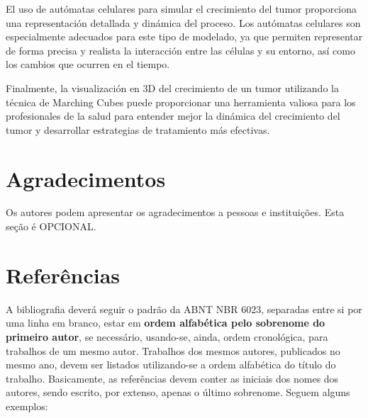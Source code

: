\documentclass[a4paper,11pt]{article}
\begin{document}
{El uso de autómatas celulares para simular el crecimiento del tumor proporciona una representación detallada y dinámica del proceso. Los autómatas celulares son especialmente adecuados para este tipo de modelado, ya que permiten representar de forma precisa y realista la interacción entre las células y su entorno, así como los cambios que ocurren en el tiempo.

Finalmente, la visualización en 3D del crecimiento de un tumor utilizando la técnica de Marching Cubes puede proporcionar una herramienta valiosa para los profesionales de la salud para entender mejor la dinámica del crecimiento del tumor y desarrollar estrategias de tratamiento más efectivas.

\section*{Agradecimentos}

Os autores podem apresentar os agradecimentos a pessoas e instituições. Esta seção é OPCIONAL.




\section*{Referências}
{\color{red} A bibliografia deverá seguir o padrão da ABNT NBR 6023, separadas entre si por uma linha em branco, estar em \textbf{ordem alfabética pelo sobrenome do primeiro autor}, se necessário, usando-se, ainda, ordem cronológica, para trabalhos de um mesmo autor. Trabalhos dos mesmos autores, publicados no mesmo ano, devem ser listados utilizando-se a ordem alfabética do título do trabalho. Basicamente, as referências devem conter as iniciais dos nomes dos autores, sendo escrito, por extenso, apenas o último sobrenome. Seguem alguns exemplos:}


\begin{flushleft}


\end{flushleft}}
\end{document}
